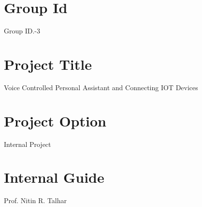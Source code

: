 \documentclass[16pt,oneside,a4paper]{article}
\begin{document}
\section{Group Id}
Group ID.-3

\section{Project Title}
Voice Controlled Personal Assistant and Connecting IOT Devices
\section{ Project Option }
Internal Project

\section{Internal Guide}
Prof. Nitin R. Talhar
\end{document}
